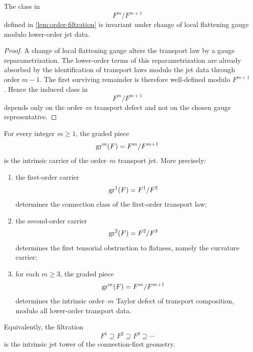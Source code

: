 \begin{lemma}
	\label{lem:gauge-order-m}
	The class in
	\[
		F^m/F^{m+1}
	\]
	defined in \cref{lem:order-filtration} is invariant under change of
	local flattening gauge modulo lower-order jet data.
\end{lemma}
\begin{proof}
	A change of local flattening gauge alters the transport law by a gauge
	reparametrization.  The lower-order terms of this reparametrization are
	already absorbed by the identification of transport laws modulo the jet
	data through order \(m-1\).  The first surviving remainder is therefore
	well-defined modulo \(F^{m+1}\).  Hence the induced class in
	\[
		F^m/F^{m+1}
	\]
	depends only on the order--\(m\) transport defect and not on the chosen
	gauge representative.
\end{proof}
\begin{theorem}
	\label{thm:jet-tower}
	For every integer \(m\ge 1\), the graded piece
	\[
		\operatorname{gr}^m(F)=F^m/F^{m+1}
	\]
	is the intrinsic carrier of the order--\(m\) transport jet.
	More precisely:
	\begin{enumerate}[label=\textup{(\roman*)}]
		\item
		      the first-order carrier
		      \[
			      \operatorname{gr}^1(F)=F^1/F^2
		      \]
		      determines the connection class of the first-order transport law;
		\item
		      the second-order carrier
		      \[
			      \operatorname{gr}^2(F)=F^2/F^3
		      \]
		      determines the first tensorial obstruction to flatness, namely the
		      curvature carrier;
		\item
		      for each \(m\ge 3\), the graded piece
		      \[
			      \operatorname{gr}^m(F)=F^m/F^{m+1}
		      \]
		      determines the intrinsic order--\(m\) Taylor defect of transport
		      composition, modulo all lower-order transport data.
	\end{enumerate}
	Equivalently, the filtration
	\[
		F^1 \supseteq F^2 \supseteq F^3 \supseteq \cdots
	\]
	is the intrinsic jet tower of the connection-first geometry.
\end{theorem}
